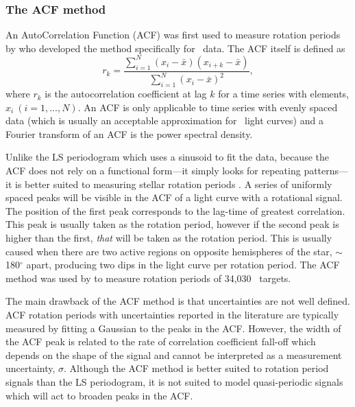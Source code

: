 \subsubsection{The ACF method}
An AutoCorrelation Function (ACF) was first used to measure rotation periods
by \citet{Mcquillan2013} who developed the method specifically for \kepler\
data.
The ACF itself is defined as
\begin{equation}
    r_k = \frac{\sum_{i=1}^{N}(x_i-\bar{x})(x_{i+k}-\bar{x})}
    {\sum_{i=1}^{N}(x_i-\bar{x})^2},
\end{equation}
where $r_k$ is the autocorrelation coefficient at lag $k$ for a time series
with elements, $x_i~(i=1,..., N)$.
An ACF is only applicable to time series with evenly spaced data (which is
usually an acceptable approximation for \kepler\ light curves) and a Fourier
transform of an ACF is the power spectral density.

Unlike the LS periodogram which uses a sinusoid to fit the data, because the
ACF does not rely on a functional form---it simply looks for repeating
patterns---it is better suited to measuring stellar rotation periods
\citep[see][for an in-depth discussion]{Mcquillan2014}.
A series of uniformly spaced peaks will be visible in the ACF of a light curve
with a rotational signal.
The position of the first peak corresponds to the lag-time of greatest
correlation.
This peak is usually taken as the rotation period, however if the second peak
is higher than the first, {\it that} will be taken as the rotation period.
This is usually caused when there are two active regions on opposite
hemispheres of the star, $\sim$ 180$^\circ$ apart, producing two dips in the
light curve per rotation period.
The ACF method was used by \citet{Mcquillan2014} to measure rotation periods
of 34,030 \kepler\ targets.

The main drawback of the ACF method is that uncertainties are not well
defined.
ACF rotation periods with uncertainties reported in the literature are
typically measured by fitting a Gaussian to the peaks in the ACF.
However, the width of the ACF peak is related to the rate of correlation
coefficient fall-off which depends on the shape of the signal and cannot be
interpreted as a measurement uncertainty, $\sigma$.
Although the ACF method is better suited to rotation period signals than the
LS periodogram, it is not suited to model quasi-periodic signals which will
act to broaden peaks in the ACF.

